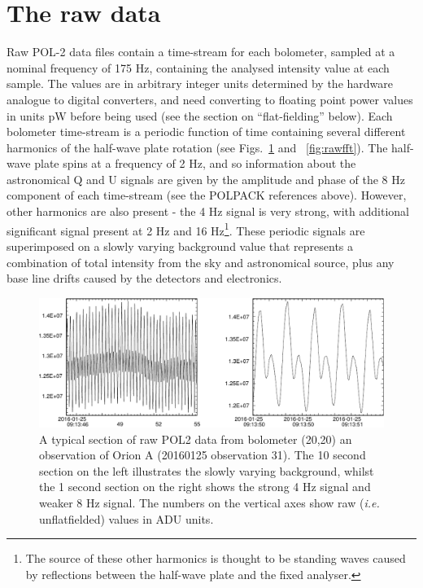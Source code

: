 \documentclass[twoside,11pt]{starlink}
\begin{document}
\section{The raw data}
Raw POL-2 data files contain a time-stream for each bolometer, sampled at
a nominal frequency of 175 Hz, containing the analysed intensity value at
each sample. The values are in arbitrary integer units determined by the
hardware analogue to digital converters, and need converting to floating
point power values in units pW before being used (see the section on
``flat-fielding'' below). Each bolometer time-stream is a periodic
function of time containing several different harmonics of the half-wave
plate rotation (see Figs.~\ref{fig:rawdata} and ~\ref{fig:rawfft}). The
half-wave plate spins at a frequency of 2 Hz, and so information about
the astronomical Q and U signals are given by the amplitude and phase of
the 8 Hz component of each time-stream (see the POLPACK references
above). However, other harmonics are also present - the 4 Hz signal is
very strong, with additional significant signal present at 2 Hz and 16
Hz\footnote{The source of these other harmonics is thought to be standing
waves caused by reflections between the half-wave plate and the fixed
analyser.}. These periodic signals are superimposed on a slowly varying
background value that represents a combination of total intensity from
the sky and astronomical source, plus any base line drifts caused by the
detectors and electronics.

\begin{figure}
\includegraphics[width=\columnwidth]{rawdata}
\caption{A typical section of raw POL2 data from bolometer (20,20) an
observation of Orion A (20160125 observation 31). The 10 second section on
the left illustrates the slowly varying background, whilst the 1 second
section on the right shows the strong 4 Hz signal and weaker 8 Hz signal.
The numbers on the vertical axes show raw (\emph{i.e.} unflatfielded) values in
ADU units.}
\label{fig:rawdata}
\end{figure}
\end{document}
